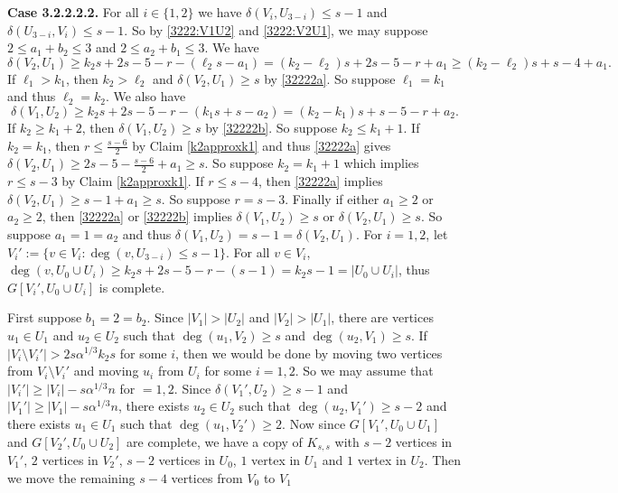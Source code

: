 \documentclass[oneside,12pt]{memoir}
\begin{document}
\textbf{Case 3.2.2.2.2.} For all $i\in\{1,2\}$ we have $\delta(V_i, U_{3-i})\leq s-1$ and $\delta(U_{3-i}, V_i)\leq s-1$.  So by \eqref{3222:V1U2} and \eqref{3222:V2U1}, we may suppose $2\leq a_1+b_2\leq 3$ and $2\leq a_2+b_1\leq 3$.  We have 
\begin{equation}\label{32222a}
\delta(V_2, U_1)\geq k_2s+2s-5-r-(\ell_2s-a_1)=(k_2-\ell_2)s+2s-5-r+a_1\geq (k_2-\ell_2)s+s-4+a_1.
\end{equation}
If $\ell_1>k_1$, then $k_2>\ell_2$ and $\delta(V_2, U_1)\geq s$ by \eqref{32222a}.  So suppose $\ell_1=k_1$ and thus $\ell_2=k_2$.  We also have
\begin{equation}\label{32222b}
\delta(V_1, U_2)\geq k_2s+2s-5-r-(k_1s+s-a_2)=(k_2-k_1)s+s-5-r+a_2.
\end{equation}
If $k_2\geq k_1+2$, then $\delta(V_1, U_2)\geq s$ by \eqref{32222b}. So suppose $k_2\leq k_1+1$.  If $k_2=k_1$, then $r\leq \frac{s-6}{2}$ by Claim \ref{k2approxk1} and thus \eqref{32222a} gives $\delta(V_2, U_1)\geq 2s-5-\frac{s-6}{2}+a_1\geq s$. So suppose $k_2=k_1+1$ which implies $r\leq s-3$ by Claim \ref{k2approxk1}.  If $r\leq s-4$, then \eqref{32222a} implies $\delta(V_2, U_1)\geq s-1+a_1\geq s$.  So suppose $r=s-3$.  Finally if either $a_1\geq 2$ or $a_2\geq 2$, then \eqref{32222a} or \eqref{32222b} implies $\delta(V_1, U_2)\geq s$ or $\delta(V_2, U_1)\geq s$.  So suppose $a_1=1=a_2$ and thus $\delta(V_1, U_2)=s-1=\delta(V_2, U_1)$.  For $i=1,2$, let $V_i':=\{v\in V_i:\deg(v, U_{3-i})\leq s-1\}$.  For all $v\in V_i$, $\deg(v, U_0\cup U_i)\geq k_2s+2s-5-r-(s-1)=k_2s-1=|U_0\cup U_i|$, thus $G[V_i', U_0\cup U_i]$ is complete.



First suppose $b_1=2=b_2$. Since $|V_1|>|U_2|$ and $|V_2|>|U_1|$, there are vertices $u_1\in U_1$ and $u_2\in U_2$ such that $\deg(u_1, V_2)\geq s$ and $\deg(u_2, V_1)\geq s$.  If $|V_i\setminus V_i'|>2s\alpha^{1/3}k_2s$ for some $i$, then we would be done by moving two vertices from $V_i\setminus V_i'$ and moving $u_i$ from $U_i$ for some $i=1,2$.  So we may assume that $|V_i'|\geq |V_i|-s\alpha^{1/3}n$ for $=1,2$.  Since $\delta(V_1', U_2)\geq s-1$ and $|V_1'|\geq |V_1|-s\alpha^{1/3}n$, there exists $u_2\in U_2$ such that $\deg(u_2, V_1')\geq s-2$ and there exists $u_1\in U_1$ such that $\deg(u_1, V_2')\geq 2$.  Now since $G[V_1', U_0\cup U_1]$ and $G[V_2', U_0\cup U_2]$ are complete, we have a copy of $K_{s,s}$ with $s-2$ vertices in $V_1'$, $2$ vertices in $V_2'$, $s-2$ vertices in $U_0$, $1$ vertex in $U_1$ and $1$ vertex in $U_2$.  Then we move the remaining $s-4$ vertices from $V_0$ to $V_1$
\end{document}
